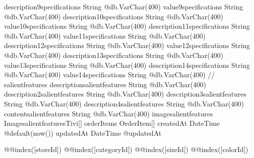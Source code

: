 {  description9specifications  String                     @db.VarChar(400)
  value9specifications        String                     @db.VarChar(400)
  description10specifications String                     @db.VarChar(400)
  value10specifications       String                     @db.VarChar(400)
  description11specifications String                     @db.VarChar(400)
  value11specifications       String                     @db.VarChar(400)
  description12specifications String                     @db.VarChar(400)
  value12specifications       String                     @db.VarChar(400)
  description13specifications String                     @db.VarChar(400)
  value13specifications       String                     @db.VarChar(400)
  description14specifications String                     @db.VarChar(400)
  value14specifications       String                     @db.VarChar(400)
  // salientfeatures
  descriptionsalientfeatures  String                     @db.VarChar(400)
  description2salientfeatures String                     @db.VarChar(400)
  description3salientfeatures String                     @db.VarChar(400)
  description4salientfeatures String                     @db.VarChar(400)
  contentsalientfeatures      String                     @db.VarChar(400)
  imagesalientfeatures    ImagesalientfeaturesTivi[]
  orderItems                  OrderItem[]
  createdAt                   DateTime                   @default(now())
  updatedAt                   DateTime                   @updatedAt

  @@index([storeId])
  @@index([categoryId])
  @@index([sizeId])
  @@index([colorId])
}


